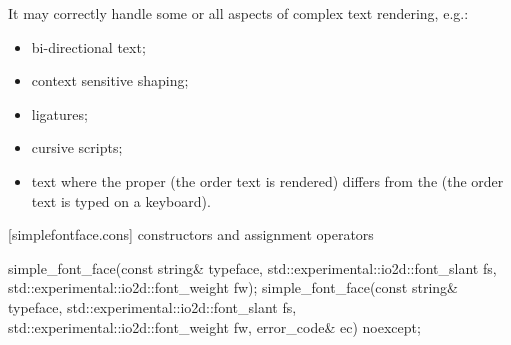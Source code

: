 \pnum
It may correctly handle some or all aspects of complex text rendering, e.g.:
\begin{itemize}
	\item bi-directional text;
	\item context sensitive shaping;
	\item ligatures;
	\item cursive scripts;
	\item text where the proper  (the order text is rendered) differs from the  (the order text is typed on a keyboard).
\end{itemize}

 [simplefontface.cons] { constructors and 
assignment operators}

\begin{itemdecl}
    simple_font_face(const string& typeface,
      std::experimental::io2d::font_slant fs,
      std::experimental::io2d::font_weight fw);
    simple_font_face(const string& typeface,
      std::experimental::io2d::font_slant fs,
      std::experimental::io2d::font_weight fw, error_code& ec) noexcept;
\end{itemdecl}
